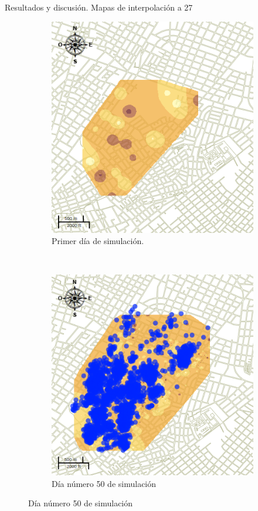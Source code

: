 \begin{frame}[t]{Resultados y discusión. Mapas de interpolación a 27 \textcelsius}
    \begin{figure}
    \begin{subfigure}[b]{0.45\textwidth}
        \includegraphics[width=\textwidth]{./graphics/inicial.png}
        \caption{ Primer día de simulación.}
    \end{subfigure}
    ~~~~
    \begin{subfigure}[b]{0.45\textwidth}
        \includegraphics[width=\textwidth]{./graphics/temp-27-final.png}
        \caption{Día número 50 de simulación}
    \end{subfigure}
    \end{figure}
\end{frame}

